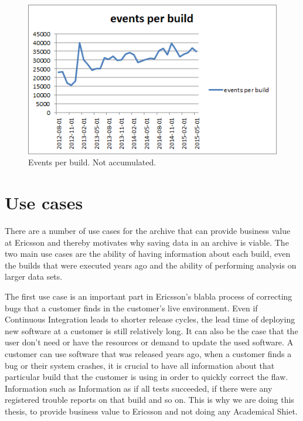 \begin{figure}[h!]
\centering
\includegraphics[]{figure/events_per_build.png}
\caption{Events per build. Not accumulated.}
\label{fig:events_per_build}
\end{figure}


\section{Use cases}
\label{sec:usecases}

There are a number of use cases for the archive that can provide business value at Ericsson and thereby motivates why saving data in an archive is viable. The two main use cases are the ability of having information about each build, even the builds that were executed years ago and the ability of performing analysis on larger data sets. 

The first use case is an important part in Ericsson's blabla process of correcting bugs that a customer finds in the customer's live environment. Even if Continuous Integration leads to shorter release cycles, the lead time of deploying new software at a customer is still relatively long. It can also be the case that the user don't need or have the resources or demand to update the used software. A customer can use software that was released years ago, when a customer finds a bug or their system crashes, it is crucial to have all information about that particular build that the customer is using in order to quickly correct the flaw. Information such as  Information as if all tests succeeded, if there were any registered trouble reports on that build and so on. This is why we are doing this thesis, to provide business value to Ericsson and not doing any Academical Shiet.


